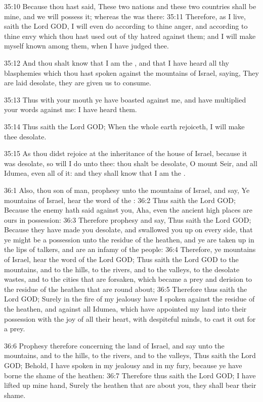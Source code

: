 35:10 Because thou hast said, These two nations and these two
countries shall be mine, and we will possess it; whereas the \LORD was
there: 35:11 Therefore, as I live, saith the Lord GOD, I will even do
according to thine anger, and according to thine envy which thou hast
used out of thy hatred against them; and I will make myself known
among them, when I have judged thee.

35:12 And thou shalt know that I am the \LORD, and that I have heard
all thy blasphemies which thou hast spoken against the mountains of
Israel, saying, They are laid desolate, they are given us to consume.

35:13 Thus with your mouth ye have boasted against me, and have
multiplied your words against me: I have heard them.

35:14 Thus saith the Lord GOD; When the whole earth rejoiceth, I will
make thee desolate.

35:15 As thou didst rejoice at the inheritance of the house of Israel,
because it was desolate, so will I do unto thee: thou shalt be
desolate, O mount Seir, and all Idumea, even all of it: and they shall
know that I am the \LORD.

36:1 Also, thou son of man, prophesy unto the mountains of Israel, and
say, Ye mountains of Israel, hear the word of the \LORD: 36:2 Thus
saith the Lord GOD; Because the enemy hath said against you, Aha, even
the ancient high places are ours in possession: 36:3 Therefore
prophesy and say, Thus saith the Lord GOD; Because they have made you
desolate, and swallowed you up on every side, that ye might be a
possession unto the residue of the heathen, and ye are taken up in the
lips of talkers, and are an infamy of the people: 36:4 Therefore, ye
mountains of Israel, hear the word of the Lord GOD; Thus saith the
Lord GOD to the mountains, and to the hills, to the rivers, and to the
valleys, to the desolate wastes, and to the cities that are forsaken,
which became a prey and derision to the residue of the heathen that
are round about; 36:5 Therefore thus saith the Lord GOD; Surely in the
fire of my jealousy have I spoken against the residue of the heathen,
and against all Idumea, which have appointed my land into their
possession with the joy of all their heart, with despiteful minds, to
cast it out for a prey.

36:6 Prophesy therefore concerning the land of Israel, and say unto
the mountains, and to the hills, to the rivers, and to the valleys,
Thus saith the Lord GOD; Behold, I have spoken in my jealousy and in
my fury, because ye have borne the shame of the heathen: 36:7
Therefore thus saith the Lord GOD; I have lifted up mine hand, Surely
the heathen that are about you, they shall bear their shame.


